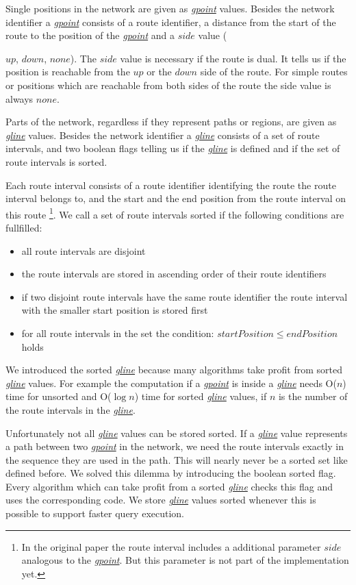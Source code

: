 \documentclass[a4paper]{article}
\newcommand{\dt}[1]{\textsl{\underline{#1}}}
\begin{document}
Single positions in the network are given as \dt{gpoint} values. Besides the
network identifier a \dt{gpoint} consists of a route identifier, a distance from
the start of the route to the position of the \dt{gpoint} and a $side$ value
({$up$, $down$, $none$). The $side$ value is necessary if the route is dual.
It tells us if the position
is reachable from the $up$ or the $down$ side of the route. For simple
routes or positions which are reachable from both sides of the route the side
value is always $none$.

Parts of the network, regardless if they represent paths or regions, are given as
\dt{gline} values. Besides the network identifier a \dt{gline} consists of a set
of route intervals, and two boolean flags telling us if the \dt{gline} is defined
and if the set of route intervals is sorted.

Each route interval consists of a route identifier identifying the route
the route interval belongs to, and the start and the end position from the
route interval on this route
\footnote{In the original paper the
route interval includes a additional parameter $side$ analogous to the \dt{gpoint}.
But this parameter is not part of the implementation yet.}.
We call a \label{sec:sortedgline}
set of route intervals sorted if the following conditions are fullfilled:
\begin{itemize}
	\item all route intervals are disjoint
	\item the route intervals are stored in ascending order of their route identifiers
	\item if two disjoint route intervals have the same route identifier the route interval
  with the smaller start position is stored first
	\item for all route intervals in the set the condition: $startPosition \le endPosition$ holds
\end{itemize}
We introduced the sorted \dt{gline} because many algorithms take profit from sorted
\dt{gline} values. For example the computation if a \dt{gpoint} is inside a
\dt{gline} needs O($n$) time for unsorted and O($\log n$) time for
sorted \dt{gline} values, if $n$ is the number of the route intervals in the
\dt{gline}.

Unfortunately not all \dt{gline} values can be stored sorted. If a \dt{gline}
value represents a path between two \dt{gpoint} in the network, we need the
route intervals exactly in the sequence they are used in the path. This will
nearly never be a sorted set like defined before. We solved this dilemma by
introducing the boolean sorted flag. Every algorithm which can take profit from a sorted
\dt{gline} checks this flag and uses the corresponding code. We store \dt{gline}
values sorted whenever this is possible to support faster query execution.

}
\end{document}
